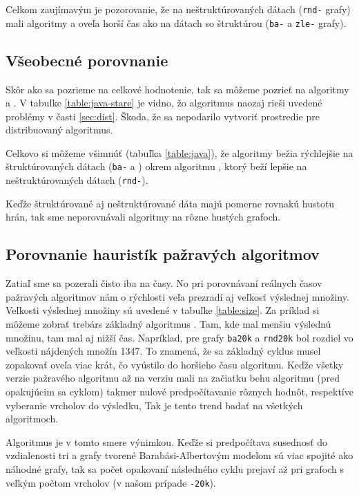Celkom zaujímavým je pozorovanie, že na neštruktúrovaných dátach (\texttt{rnd-} 
grafy) mali algoritmy  a  oveľa horší čas ako na 
dátach so štruktúrou (\texttt{ba-} a \texttt{zle-} grafy).

\subsection{Všeobecné porovnanie}

Skôr ako sa pozrieme na celkové hodnotenie, tak sa môžeme pozrieť na algoritmy 
 a . V tabuľke \ref{table:java-stare} je vidno, 
žo algoritmus  naozaj rieši uvedené problémy v časti 
\ref{sec:dist}. Škoda, že sa nepodarilo vytvoriť prostredie pre distribuovaný 
algoritmus.

Celkovo si môžeme všimnúť (tabuľka \ref{table:java}), že algoritmy bežia 
rýchlejšie na štruktúrovaných dátach (\texttt{ba-} a ) okrem 
algoritmu , ktorý beží lepšie na neštruktúrovaných dátach 
(\texttt{rnd-}). 

Keďže štruktúrované aj neštruktúrované dáta majú pomerne rovnakú hustotu hrán, 
tak sme neporovnávali algoritmy na rôzne hustých grafoch.

\subsection{Porovnanie hauristík pažravých algoritmov}

Zatiaľ sme sa pozerali čisto iba na časy. No pri porovnávaní reálnych časov 
pažravých algoritmov nám o rýchlosti veľa prezradí aj veľkosť výslednej 
množiny. Veľkosti výslednej množiny sú uvedené v tabuľke \ref{table:size}. 
Za príklad si môžeme zobrať trebárs základný algoritmus . Tam, 
kde mal menšiu výslednú množinu, tam mal aj nižší čas. Napríklad, pre grafy 
\texttt{ba20k} a \texttt{rnd20k} bol rozdiel vo veľkosti nájdených množín 1347. 
To znamená, že sa základný cyklus musel zopakovať oveľa viac krát, čo vyústilo 
do horšieho času algoritmu. Keďže všetky verzie pažravého algoritmu až na 
verziu  mali na začiatku behu algoritmu (pred opakujúcim sa cyklom) 
takmer nulové predpočítavanie rôznych hodnôt, respektíve vyberanie vrcholov do 
výsledku, Tak je tento trend badať na všetkých algoritmoch. 

Algoritmus  je v tomto smere výnimkou. Keďže si predpočítava 
susednosť do vzdialenosti tri a grafy tvorené Barabási-Albertovým modelom sú 
viac spojité ako náhodné grafy, tak sa počet opakovaní následného cyklu prejaví 
až pri grafoch s veľkým počtom vrcholov (v našom prípade \texttt{-20k}).

